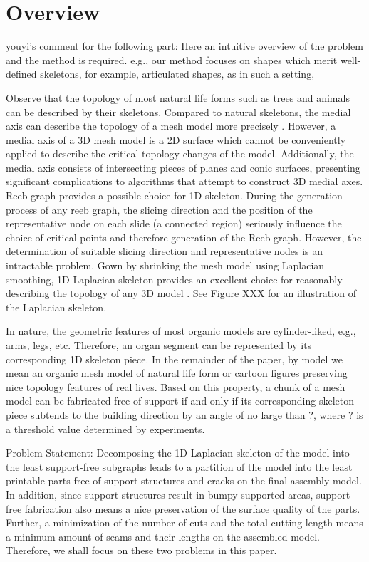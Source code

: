 \section{Overview}

{youyi's comment for the following part: Here an intuitive overview of the problem  and the method is required. e.g., our method focuses on shapes which merit well-defined skeletons, for example, articulated shapes, as in such a setting,}

Observe that the topology of most natural life forms such as trees and animals can be described by their skeletons. Compared to natural skeletons, the medial axis can describe the topology of a mesh model more precisely \cite{ZhangXWYTW15}. However, a medial axis of a 3D mesh model is a 2D surface which cannot be conveniently applied to describe the critical topology changes of the model. Additionally, the medial axis consists of intersecting pieces of planes and conic surfaces, presenting significant complications to algorithms that attempt to construct 3D medial axes.
Reeb graph provides a possible choice for 1D skeleton. During the generation process of any reeb graph, the slicing direction and the position of the representative node on each slide (a connected region) seriously influence the choice of critical points and therefore generation of the Reeb graph. However, the determination of suitable slicing direction and representative nodes is an intractable problem.
Gown by shrinking the mesh model using Laplacian smoothing, 1D Laplacian skeleton provides an excellent choice for reasonably describing the topology of any 3D model \cite{AuTCCL08}. See Figure XXX for an illustration of the Laplacian skeleton.

In nature, the geometric features of most organic models are cylinder-liked, e.g., arms, legs, etc. Therefore, an organ segment can be represented by its corresponding 1D skeleton piece. In the remainder of the paper, by model we mean an organic mesh model of natural life form or cartoon figures preserving nice topology features of real lives. Based on this property, a chunk of a mesh model can be fabricated free of support if and only if its corresponding skeleton piece subtends to the building direction by an angle of no large than ?, where ? is a threshold value determined by experiments.

Problem Statement: Decomposing the 1D Laplacian skeleton of the model into the least support-free subgraphs leads to a partition of the model into the least printable parts free of support structures and cracks on the final assembly model. In addition, since support structures result in bumpy supported areas, support-free fabrication also means a nice preservation of the surface quality of the parts. Further, a minimization of the number of cuts and the total cutting length means a minimum amount of seams and their lengths on the assembled model. Therefore, we shall focus on these two problems in this paper.

